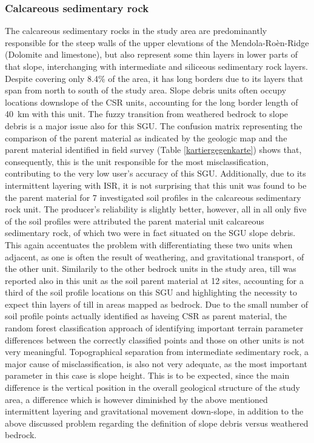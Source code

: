 \documentclass[preprint,12pt,authoryear]{elsarticle}
\begin{document}
\subsubsection{Calcareous sedimentary rock}
The calcareous sedimentary rocks in the study area are predominantly  responsible for the steep walls of the upper elevations of the  Mendola-Ro\`en-Ridge (Dolomite and limestone), but also represent some thin layers in lower parts of that slope, interchanging with intermediate and siliceous sedimentary rock layers. Despite covering only 8.4\% of the area, it has long borders due to its layers that span from north to south of the study area. Slope debris units often occupy locations downslope of the CSR units, accounting for the long  border length of 40~km with this unit. The fuzzy transition from weathered bedrock to slope debris is a major issue also for this SGU. The confusion matrix representing the comparison of the parent material as indicated by the geologic map and the parent material identified in field survey (Table \ref{kartiergegenkarte}) shows that, consequently, this is the unit responsible for the most misclassification, contributing to the very low user's accuracy of this SGU. Additionally, due to its intermittent layering with ISR, it is not surprising that this unit was found to be the parent material for 7 investigated soil profiles in the calcareous sedimentary rock unit. The producer's reliability is slightly better, however, all in all only five of the soil profiles were attributed the parent material unit calcareous sedimentary rock, of which two were in fact situated on the SGU slope debris. This again accentuates the problem with differentiating these two units when adjacent, as one is often the result of weathering, and gravitational transport, of the other unit. Similarily to the other bedrock units in the study area, till was reported also in this unit as the soil parent material at 12 sites, accounting for a third of the soil profile locations on this SGU and highlighting the necessity to expect thin layers of till in areas mapped as bedrock. Due to the small number of soil profile points actually identified as haveing CSR as parent material, the random forest classification approach of identifying important terrain parameter differences between the correctly classified points and those on other units is not very meaningful. Topographical separation from intermediate sedimentary rock, a major cause of misclassification, is also not very adequate, as the most important parameter in this case is slope height. This is to be expected, since the main difference is the vertical position in the overall geological structure of the study area, a difference which is however diminished by the above mentioned intermittent layering and gravitational movement down-slope, in addition to the above discussed problem regarding the definition of slope debris versus weathered bedrock.
\end{document}
